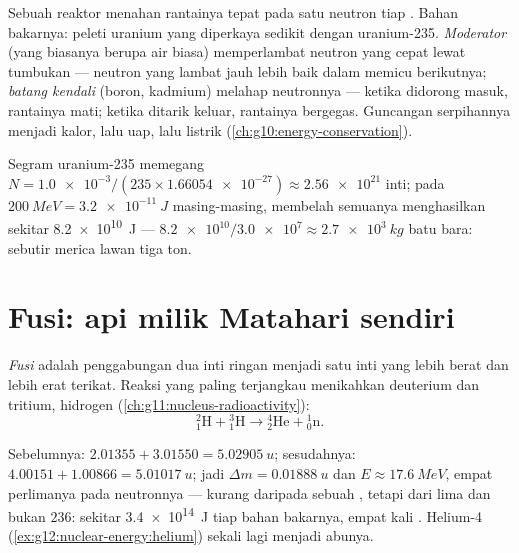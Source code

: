 \begin{definition}\label{def:g12:nuclear-energy:reactor}
Sebuah reaktor  menahan rantainya tepat pada satu neutron tiap . Bahan bakarnya:
peleti uranium yang diperkaya sedikit dengan uranium-235.
\emph{Moderator} (yang biasanya berupa air biasa) memperlambat
neutron  yang cepat lewat tumbukan --- neutron yang lambat jauh lebih baik dalam memicu
 berikutnya; \emph{batang kendali} (boron, kadmium)
melahap neutronnya --- ketika didorong masuk, rantainya mati; ketika ditarik keluar, rantainya bergegas.
Guncangan serpihannya menjadi kalor, lalu uap, lalu listrik
(\cref{ch:g10:energy-conservation}).
\end{definition}

\begin{example}\label{ex:g12:nuclear-energy:gram}
Segram uranium-235 memegang
$N = \num{1.0e-3} / (235 \times \num{1.66054e-27}) \approx \num{2.56e21}$
inti; pada $\qty{200}{MeV} = \qty{3.2e-11}{J}$ masing-masing, membelah semuanya
menghasilkan sekitar \qty{8.2e10}{J} ---  $\num{8.2e10} /
\num{3.0e7} \approx \qty{2.7e3}{kg}$ batu bara: sebutir merica lawan tiga ton.
\end{example}

\section{Fusi: api milik Matahari sendiri}

\begin{definition}[Fusi]\label{def:g12:nuclear-energy:fusion}
\emph{Fusi} adalah penggabungan dua inti ringan menjadi satu inti yang lebih berat
dan lebih erat terikat. Reaksi yang paling terjangkau menikahkan deuterium dan
tritium,   hidrogen (\cref{ch:g11:nucleus-radioactivity}):
\[
{}^{2}_{1}\mathrm{H} + {}^{3}_{1}\mathrm{H} \longrightarrow
{}^{4}_{2}\mathrm{He} + {}^{1}_{0}\mathrm{n}.
\]
\end{definition}

\begin{example}\label{ex:g12:nuclear-energy:dt}
Sebelumnya: $2.01355 + 3.01550 = \qty{5.02905}{u}$; sesudahnya:
$4.00151 + 1.00866 = \qty{5.01017}{u}$; jadi $\Delta m = \qty{0.01888}{u}$ dan
$E \approx \qty{17.6}{MeV}$, empat perlimanya pada neutronnya --- kurang daripada
sebuah , tetapi dari lima  dan bukan $236$: sekitar \qty{3.4e14}{J} tiap
 bahan bakarnya, empat kali . Helium-4
(\cref{ex:g12:nuclear-energy:helium}) sekali lagi menjadi abunya.
\end{example}

